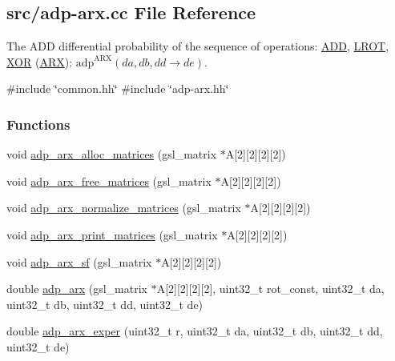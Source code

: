 \hypertarget{adp-arx_8cc}{\subsection{src/adp-\/arx.cc \-File \-Reference}
\label{adp-arx_8cc}
}


\-The \-A\-D\-D differential probability of the sequence of operations\-: \hyperlink{common_8hh_af3b709fb668cf93ca09e2a46a2a031a8}{\-A\-D\-D}, \hyperlink{common_8hh_abe2030c44a97657e1b1dbe9b0e093a7b}{\-L\-R\-O\-T}, \hyperlink{common_8hh_a6de9ec3b3b57377b69a82239ea52ec6e}{\-X\-O\-R} (\hyperlink{common_8hh_a7d3da57c58af293c7c57e4f1b551849d}{\-A\-R\-X})\-: $\mathrm{adp}^{\mathrm{ARX}}(da,db,dd \rightarrow de)$.  


{\ttfamily \#include \char`\"{}common.\-hh\char`\"{}}\*
{\ttfamily \#include \char`\"{}adp-\/arx.\-hh\char`\"{}}\*
\subsubsection*{\-Functions}
\begin{DoxyCompactItemize}
\item 
void \hyperlink{adp-arx_8cc_a0e3aa2c19e8b7d5fcba1e89cf006db89}{adp\-\_\-arx\-\_\-alloc\-\_\-matrices} (gsl\-\_\-matrix $\ast$\-A\mbox{[}2\mbox{]}\mbox{[}2\mbox{]}\mbox{[}2\mbox{]}\mbox{[}2\mbox{]})
\item 
void \hyperlink{adp-arx_8cc_ae1fcdf1ecd195a8f04fb0326668bf26b}{adp\-\_\-arx\-\_\-free\-\_\-matrices} (gsl\-\_\-matrix $\ast$\-A\mbox{[}2\mbox{]}\mbox{[}2\mbox{]}\mbox{[}2\mbox{]}\mbox{[}2\mbox{]})
\item 
void \hyperlink{adp-arx_8cc_ac01a2e9e7af3e0d465790661d367cb16}{adp\-\_\-arx\-\_\-normalize\-\_\-matrices} (gsl\-\_\-matrix $\ast$\-A\mbox{[}2\mbox{]}\mbox{[}2\mbox{]}\mbox{[}2\mbox{]}\mbox{[}2\mbox{]})
\item 
void \hyperlink{adp-arx_8cc_a06fdc4a92e7c1cac3d6ffd193ac6ccdb}{adp\-\_\-arx\-\_\-print\-\_\-matrices} (gsl\-\_\-matrix $\ast$\-A\mbox{[}2\mbox{]}\mbox{[}2\mbox{]}\mbox{[}2\mbox{]}\mbox{[}2\mbox{]})
\item 
void \hyperlink{adp-arx_8cc_afa557fabb780c1febded3e85fe3c7510}{adp\-\_\-arx\-\_\-sf} (gsl\-\_\-matrix $\ast$\-A\mbox{[}2\mbox{]}\mbox{[}2\mbox{]}\mbox{[}2\mbox{]}\mbox{[}2\mbox{]})
\item 
double \hyperlink{adp-arx_8cc_a9788b8bb5ea34b5d310b22e95ae80ab9}{adp\-\_\-arx} (gsl\-\_\-matrix $\ast$\-A\mbox{[}2\mbox{]}\mbox{[}2\mbox{]}\mbox{[}2\mbox{]}\mbox{[}2\mbox{]}, uint32\-\_\-t rot\-\_\-const, uint32\-\_\-t da, uint32\-\_\-t db, uint32\-\_\-t dd, uint32\-\_\-t de)
\item 
double \hyperlink{adp-arx_8cc_a3121eabeb0597c8e6f1945e96a69ae62}{adp\-\_\-arx\-\_\-exper} (uint32\-\_\-t r, uint32\-\_\-t da, uint32\-\_\-t db, uint32\-\_\-t dd, uint32\-\_\-t de)
\end{DoxyCompactItemize}
